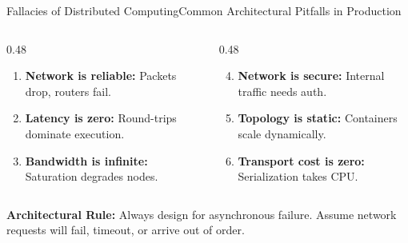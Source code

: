 \documentclass[aspectratio=169, 10pt]{beamer}
\begin{document}
\begin{frame}{Fallacies of Distributed Computing}{Common Architectural Pitfalls in Production}
  \vspace*{-0.3cm}
  \begin{columns}[T]
    \begin{column}{0.48\textwidth}
      \begin{tcolorbox}[nordiccard, title={\color{NordicBlue}\faExclamationTriangle\ \,Network Assumptions}]
        \begin{enumerate}
          \item \textbf{Network is reliable:} Packets drop, routers fail.
          \item \textbf{Latency is zero:} Round-trips dominate execution.
          \item \textbf{Bandwidth is infinite:} Saturation degrades nodes.
        \end{enumerate}
      \end{tcolorbox}
    \end{column}

    \begin{column}{0.48\textwidth}
      \begin{tcolorbox}[nordiccard, title={\color{NordicTeal}\faNetworkWired\ \,Topology Assumptions}]
        \begin{enumerate}\setcounter{enumii}{3}
          \item \textbf{Network is secure:} Internal traffic needs auth.
          \item \textbf{Topology is static:} Containers scale dynamically.
          \item \textbf{Transport cost is zero:} Serialization takes CPU.
        \end{enumerate}
      \end{tcolorbox}
    \end{column}
  \end{columns}

  \vspace*{0.1cm}
  \begin{tcolorbox}[nordictealbox]
    {\color{NordicDark}\bfseries Architectural Rule:} Always design for asynchronous failure. Assume network requests will fail, timeout, or arrive out of order.
  \end{tcolorbox}
\end{frame}
\end{document}
